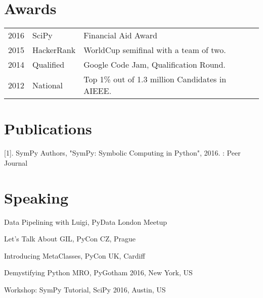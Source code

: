 \documentclass[]{deedy-resume-openfont}
\begin{document}
\begin{minipage}[t]{0.66\textwidth}




\section{Awards} 
\begin{tabular}{rll}
2016	     & SciPy  & Financial Aid Award\\
2015	     & HackerRank  & WorldCup semifinal with a team of two.\\
2014	     & Qualified  & Google Code Jam, Qualification Round.\\
2012     & National & Top 1\% out of 1.3 million Candidates in AIEEE.\\
\end{tabular}
\sectionsep



\section{Publications} 
\renewcommand\refname{\vskip -1.5cm} %


\nocite{*}
[1]. SymPy Authors, "SymPy: Symbolic Computing in Python", 2016. : Peer Journal


\section{Speaking}
\begin{tightemize}
\item Data Pipelining with Luigi, PyData London Meetup 
\item Let's Talk About GIL, PyCon CZ, Prague
\item Introducing MetaClasses, PyCon UK, Cardiff
\item Demystifying Python MRO, PyGotham 2016, New York, US
\item Workshop: SymPy Tutorial, SciPy 2016, Austin, US
\end{tightemize}


\end{minipage}
\end{document}
